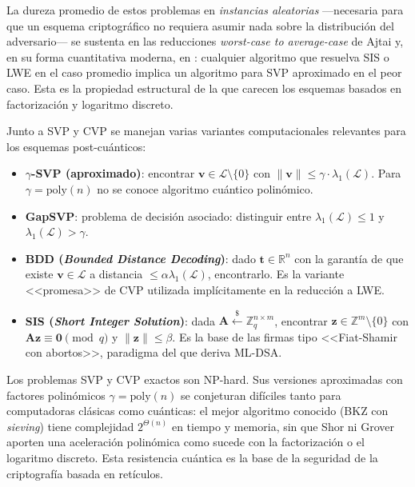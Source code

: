 La dureza promedio de estos problemas en \emph{instancias aleatorias} ---necesaria para que un esquema criptográfico no requiera asumir nada sobre la distribución del adversario--- se sustenta en las reducciones \emph{worst-case to average-case} de Ajtai \parencite{ajtai1996generating} y, en su forma cuantitativa moderna, en \textcite{micciancio2009worst}: cualquier algoritmo que resuelva SIS o LWE en el caso promedio implica un algoritmo para SVP aproximado en el peor caso. Esta es la propiedad estructural de la que carecen los esquemas basados en factorización y logaritmo discreto.

Junto a SVP y CVP se manejan varias variantes computacionales relevantes para los esquemas post-cuánticos:

\begin{itemize}
  \item \textbf{$\gamma$-SVP (aproximado)}: encontrar $\mathbf{v} \in \mathcal{L} \setminus \{0\}$ con $\|\mathbf{v}\| \leq \gamma \cdot \lambda_1(\mathcal{L})$. Para $\gamma = \text{poly}(n)$ no se conoce algoritmo cuántico polinómico.
  \item \textbf{GapSVP}: problema de decisión asociado: distinguir entre $\lambda_1(\mathcal{L}) \leq 1$ y $\lambda_1(\mathcal{L}) > \gamma$.
  \item \textbf{BDD (\emph{Bounded Distance Decoding})}: dado $\mathbf{t} \in \mathbb{R}^n$ con la garantía de que existe $\mathbf{v} \in \mathcal{L}$ a distancia $\leq \alpha \lambda_1(\mathcal{L})$, encontrarlo. Es la variante <<promesa>> de CVP utilizada implícitamente en la reducción a LWE.
  \item \textbf{SIS (\emph{Short Integer Solution})}: dada $\mathbf{A} \xleftarrow{\$} \mathbb{Z}_q^{n \times m}$, encontrar $\mathbf{z} \in \mathbb{Z}^m \setminus \{0\}$ con $\mathbf{A}\mathbf{z} \equiv \mathbf{0} \pmod{q}$ y $\|\mathbf{z}\| \leq \beta$. Es la base de las firmas tipo <<Fiat-Shamir con abortos>>, paradigma del que deriva ML-DSA.
\end{itemize}

Los problemas SVP y CVP exactos son NP-hard. Sus versiones aproximadas con factores polinómicos $\gamma = \text{poly}(n)$ se conjeturan difíciles tanto para computadoras clásicas como cuánticas: el mejor algoritmo conocido (BKZ con \emph{sieving}) tiene complejidad $2^{\Theta(n)}$ en tiempo y memoria, sin que Shor ni Grover aporten una aceleración polinómica como sucede con la factorización o el logaritmo discreto. Esta resistencia cuántica es la base de la seguridad de la criptografía basada en retículos.

